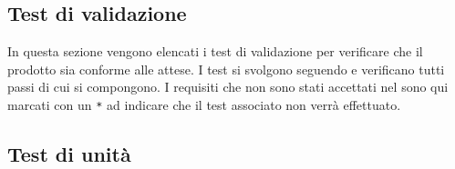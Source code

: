 	\subsection{Test di validazione}
	In questa sezione vengono elencati i test di validazione per verificare che il prodotto sia conforme alle attese. I test si svolgono seguendo e verificano tutti passi di cui si compongono. I requisiti che non sono stati accettati nel \AnalisiDeiRequisiti{} sono qui marcati con un \texttt{*} ad indicare che il test associato non verrà effettuato.
	
	
	
	
	\subsection{Test di unità}
	
	
	
	
	

